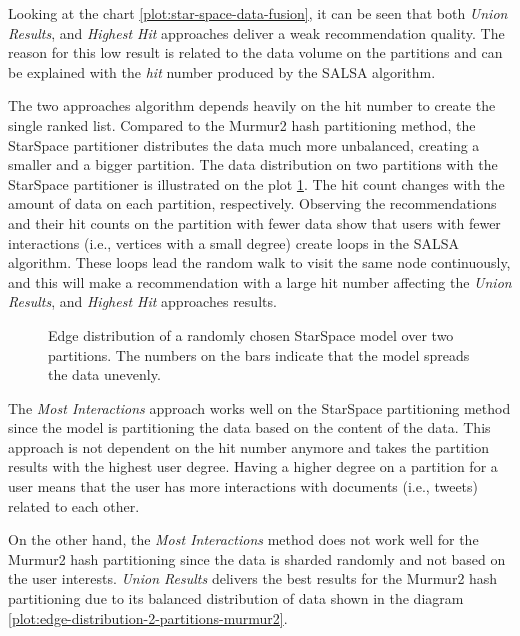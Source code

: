Looking at the chart \ref{plot:star-space-data-fusion}, it can be seen that both \emph{Union Results}, and \emph{Highest Hit} approaches deliver a weak recommendation quality. The reason for this low result is related to the data volume on the partitions and can be explained with the \emph{hit} number produced by the SALSA algorithm. 


The two approaches algorithm depends heavily on the hit number to create the single ranked list. Compared to the Murmur2 hash partitioning method, the StarSpace partitioner distributes the data much more unbalanced, creating a smaller and a bigger partition. The data distribution on two partitions with the StarSpace partitioner is illustrated on the plot \ref{plot:star-space-edge-distribution-2-partitions}. The hit count changes with the amount of data on each partition, respectively. Observing the recommendations and their hit counts on the partition with fewer data show that users with fewer interactions (i.e., vertices with a small degree) create loops in the SALSA algorithm. These loops lead the random walk to visit the same node continuously, and this will make a recommendation with a large hit number affecting the \emph{Union Results}, and \emph{Highest Hit} approaches results.


\begin{figure}[!htb]
    \centering
    
    \caption{Edge distribution of a randomly chosen StarSpace model over two partitions. The numbers on the bars indicate that the model spreads the data unevenly.}
    \label{plot:star-space-edge-distribution-2-partitions}
\end{figure}


The \emph{Most Interactions} approach works well on the StarSpace partitioning method since the model is partitioning the data based on the content of the data. This approach is not dependent on the hit number anymore and takes the partition results with the highest user degree. Having a higher degree on a partition for a user means that the user has more interactions with documents (i.e., tweets) related to each other. 


On the other hand, the \emph{Most Interactions} method does not work well for the Murmur2 hash partitioning since the data is sharded randomly and not based on the user interests. \emph{Union Results} delivers the best results for the Murmur2 hash partitioning due to its balanced distribution of data shown in the diagram \ref{plot:edge-distribution-2-partitions-murmur2}. 


